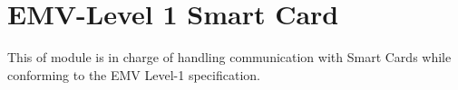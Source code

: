\hypertarget{group__pcibx__sc}{}\section{E\+M\+V-\/\+Level 1 Smart Card}
\label{group__pcibx__sc}
This of module is in charge of handling communication with Smart Cards while conforming to the E\+MV Level-\/1 specification. 